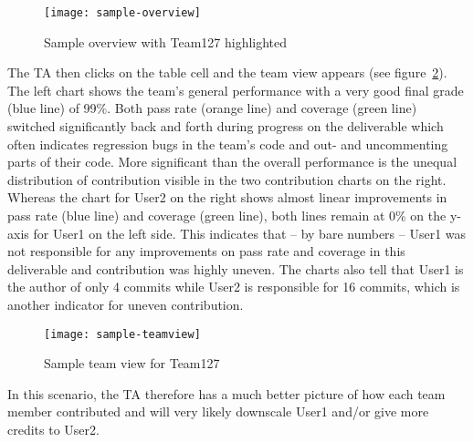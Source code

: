 \documentclass[../manifest.tex]{subfiles}
\begin{document}
\begin{figure}[h]
  \centering
  \texttt{[image: sample-overview]}
  \caption{Sample overview with Team127 highlighted}
  \label{fig:sample-overview}
\end{figure}

The TA then clicks on the table cell and the team view appears (see figure~\ref{fig:sample-teamview}). The left chart shows the team's general performance with a very good final grade (blue line) of 99\%. Both pass rate (orange line) and coverage (green line) switched significantly back and forth during progress on the deliverable which often indicates regression bugs in the team's code and out- and uncommenting parts of their code. More significant than the overall performance is the unequal distribution of contribution visible in the two contribution charts on the right. Whereas the chart for User2 on the right shows almost linear improvements in pass rate (blue line) and coverage (green line), both lines remain at 0\% on the y-axis for User1 on the left side. This indicates that -- by bare numbers -- User1 was not responsible for any improvements on pass rate and coverage in this deliverable and contribution was highly uneven. The charts also tell that User1 is the author of only 4 commits while User2 is responsible for 16 commits, which is another indicator for uneven contribution.

\begin{figure}[h]
  \centering
  \texttt{[image: sample-teamview]}
  \caption{Sample team view for Team127}
  \label{fig:sample-teamview}
\end{figure}

In this scenario, the TA therefore has a much better picture of how each team member contributed and will very likely downscale User1 and/or give more credits to User2.
\end{document}
